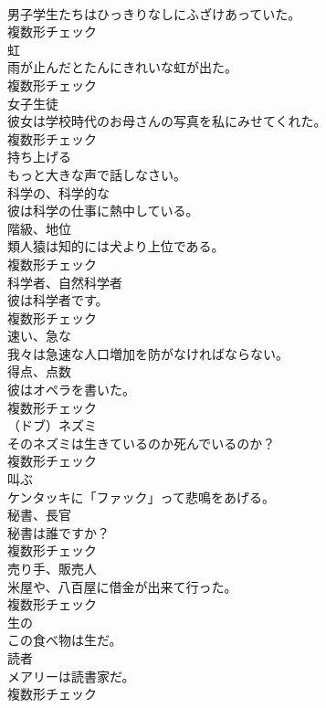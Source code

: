 \documentclass[8pt]{extreport}
\begin{document}
\begin{CJK}{UTF8}{min}
\\	男子学生たちはひっきりなしにふざけあっていた。	
\\	複数形チェック
\\	[名詞]	虹	
\\	雨が止んだとたんにきれいな虹が出た。	
\\	複数形チェック
\\	[名詞]	女子生徒	
\\	彼女は学校時代のお母さんの写真を私にみせてくれた。	
\\	複数形チェック
\\	[動詞]	持ち上げる	
\\	もっと大きな声で話しなさい。	
\\	[形容詞]	科学の、科学的な	
\\	彼は科学の仕事に熱中している。	
\\	[名詞]	階級、地位	
\\	類人猿は知的には犬より上位である。	
\\	複数形チェック
\\	[名詞]	科学者、自然科学者	
\\	彼は科学者です。	
\\	複数形チェック
\\	[形容詞]	速い、急な	
\\	我々は急速な人口増加を防がなければならない。	
\\	[名詞]	得点、点数	
\\	彼はオペラを書いた。	
\\	複数形チェック
\\	[名詞]	（ドブ）ネズミ	
\\	そのネズミは生きているのか死んでいるのか？	
\\	複数形チェック
\\	[動詞]	叫ぶ	
\\	ケンタッキに「ファック」って悲鳴をあげる。	
\\	[名詞]	秘書、⻑官	
\\	秘書は誰ですか？	
\\	複数形チェック
\\	[名詞]	売り手、販売人	
\\	米屋や、八百屋に借金が出来て行った。	
\\	複数形チェック
\\	[形容詞]	生の	
\\	この食べ物は生だ。	
\\	[名詞]	読者	
\\	メアリーは読書家だ。	
\\	複数形チェック

\end{CJK}
\end{document}
